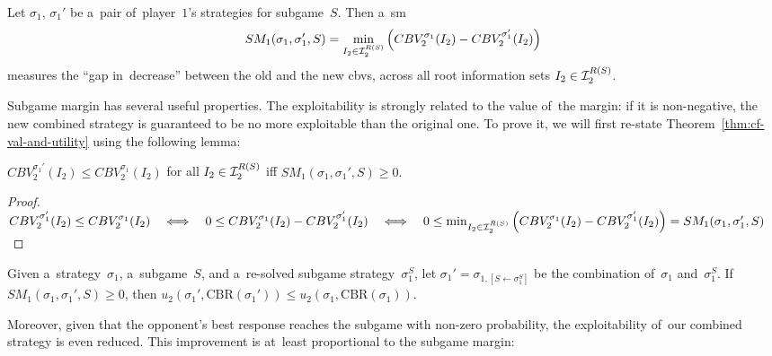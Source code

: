 \begin{framed}
  \begin{defn}[\acrlong{sm}]
    Let $\sigma_1$, $\sigma_1'$ be a~pair of~player~$1$'s strategies for subgame~$S$.
    Then a~\acrlong{sm}
    \[
      SM_1 (\sigma_1, \sigma_1' , S) =
      \min_{I_2 \in \mathcal{I}_2^{R(S)}}
      \left( CBV_2^{\sigma_1} (I_2) - CBV_2^{\sigma_1'} (I_2) \right)
    \]
    measures the ``gap in~decrease'' between the old and the new \acrlong{cbv}s, across all root information sets $I_2 \in \mathcal{I}_2^{R(S)}$.
  \end{defn}
\end{framed}

Subgame margin has several useful properties.
The exploitability is strongly related to the value of~the margin:
if it is non-negative, the new combined strategy is guaranteed to be no more exploitable than the original one.
To prove it, we will first re-state Theorem~\ref{thm:cf-val-and-utility} using the following lemma:
\begin{lem}
  \label{lem:cbv-and-sm}
  $CBV_2^{\sigma_1'} (I_2) \leq CBV_2^{\sigma_1} (I_2)$ for all $I_2 \in \mathcal{I}_2^{R(S)}$
  iff
  $SM_1 (\sigma_1, \sigma_1' , S) \geq 0.$
\end{lem}
\begin{proof}
  $
  CBV_2^{\sigma_1'} (I_2) \leq CBV_2^{\sigma_1} (I_2)
  \quad \Longleftrightarrow \quad
  0 \leq CBV_2^{\sigma_1} (I_2) - CBV_2^{\sigma_1'} (I_2)
  \quad \Longleftrightarrow \quad
  0 \leq \min_{I_2 \in \mathcal{I}_2^{R(S)}} \left( CBV_2^{\sigma_1} (I_2) - CBV_2^{\sigma_1'} (I_2) \right)
  = SM_1 (\sigma_1, \sigma_1' , S)
  $
\end{proof}

\begin{cor}
  \label{cor:sm-and-utility}
  Given a~strategy~$\sigma_1$, a~subgame~$S$, and a~re-solved subgame strategy~$\sigma_1^S$, let $\sigma_1' = \sigma_{1, [S \leftarrow \sigma_1^S]}$ be the combination of~$\sigma_1$ and~$\sigma_1^S$.
  If $SM_1 (\sigma_1, \sigma_1' , S) \geq 0$, then $u_2(\sigma_1', \textrm{CBR}(\sigma_1')) \leq  u_2(\sigma_1, \textrm{CBR}(\sigma_1))$.
\end{cor}

Moreover, given that the opponent's best response reaches the subgame with non-zero probability, the exploitability of~our combined strategy is even reduced.
This improvement is at~least proportional to the subgame margin:

